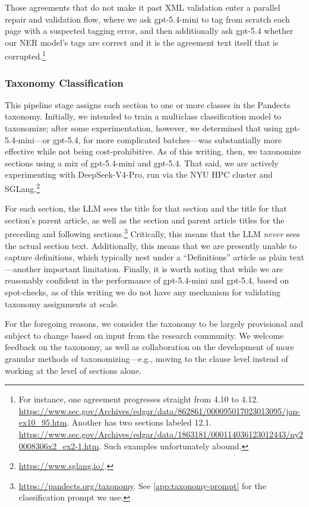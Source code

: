 \documentclass[12pt]{article}
\begin{document}
Those agreements that do not make it past XML validation enter a parallel repair and validation flow, where we ask gpt-5.4-mini to tag from scratch each page with a suspected tagging error, and then additionally ask gpt-5.4 whether our NER model's tags are correct and it is the agreement text itself that is corrupted.\footnote{For instance, one agreement progresses straight from 4.10 to 4.12. \url{https://www.sec.gov/Archives/edgar/data/862861/000095017023013095/jan-ex10_95.htm}. Another has two sections labeled 12.1. \url{https://www.sec.gov/Archives/edgar/data/1863181/000114036123012443/ny20008306x2_ex2-1.htm}. Such examples unfortunately abound.}

\subsubsection{Taxonomy Classification}\label{sec:taxonomy-classification}
This pipeline stage assigns each section to one or more classes in the Pandects taxonomy. Initially, we intended to train a multiclass classification model to taxonomize; after some experimentation, however, we determined that using gpt-5.4-mini—or gpt-5.4, for more complicated batches—was substantially more effective while not being cost-prohibitive. As of this writing, then, we taxonomize sections using a mix of gpt-5.4-mini and gpt-5.4. That said, we are actively experimenting with DeepSeek-V4-Pro, run via the NYU HPC cluster and SGLang.\footnote{\url{https://www.sglang.io/}.}

For each section, the LLM sees the title for that section and the title for that section's parent article, as well as the section and parent article titles for the preceding and following sections.\footnote{\url{https://pandects.org/taxonomy}. See \autoref{app:taxonomy-prompt} for the classification prompt we use.} Critically, this means that the LLM \emph{never} sees the actual section text. Additionally, this means that we are presently unable to capture definitions, which typically nest under a ``Definitions'' article as plain text—another important limitation. Finally, it is worth noting that while we are reasonably confident in the performance of gpt-5.4-mini and gpt-5.4, based on spot-checks, as of this writing we do not have any mechanism for validating taxonomy assignments at scale.

For the foregoing reasons, we consider the taxonomy to be largely provisional and subject to change based on input from the research community. We welcome feedback on the taxonomy, as well as collaboration on the development of more granular methods of taxonomizing—e.g., moving to the clause level instead of working at the level of sections alone.
\end{document}
